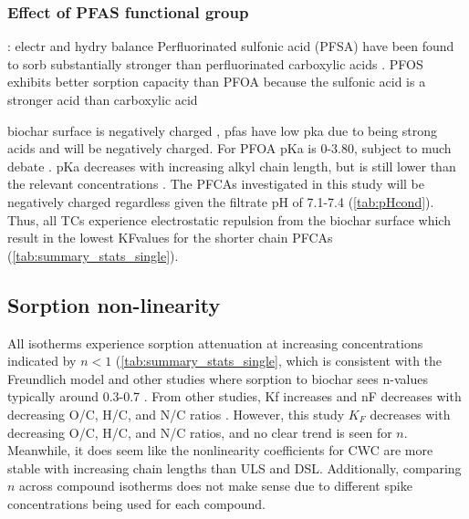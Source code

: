 \subsubsection{Effect of PFAS functional group}
\cite{du2014adsorption}: electr and hydry balance 
Perfluorinated sulfonic acid (PFSA) have been found to sorb substantially stronger than perfluorinated carboxylic acids \citep{zhang2013sorption,zhang2021sorption}. PFOS exhibits better sorption capacity than PFOA because the sulfonic acid is a stronger acid than carboxylic acid \citep{arvaniti2015review}

biochar surface is negatively charged \citep{Ahmad2014}, pfas have low pka due to being strong acids and will be negatively charged. For PFOA pKa is 0-3.80, subject to much debate \citep{Goss2009comment,ding2013physicochemical}. pKa decreases with increasing alkyl chain length, but is still lower than the relevant concentrations \citep{ding2013physicochemical}. The PFCAs investigated in this study will be negatively charged regardless given the filtrate pH of 7.1-7.4 (\cref{tab:pHcond}). Thus, all TCs experience electrostatic repulsion from the biochar surface which result in the lowest KFvalues for the shorter chain PFCAs (\cref{tab:summary_stats_single}). 

\subsection{Sorption non-linearity}
All isotherms experience sorption attenuation at increasing concentrations indicated by $n<1 $ (\cref{tab:summary_stats_single}, which is consistent with the Freundlich model and other studies where sorption to biochar sees n-values typically around 0.3-0.7 \citep{Cornelissen2005}. From other studies, Kf increases and nF decreases with decreasing O/C, H/C, and N/C ratios \citep{Cornelissen2005}. However, this study $K_F$ decreases with decreasing O/C, H/C, and N/C ratios, and no clear trend is seen for $n$. Meanwhile, it does seem like the nonlinearity coefficients for CWC are more stable with increasing chain lengths than ULS and DSL. Additionally, comparing $n$ across compound isotherms does not make sense due to different spike concentrations being used for each compound. 

